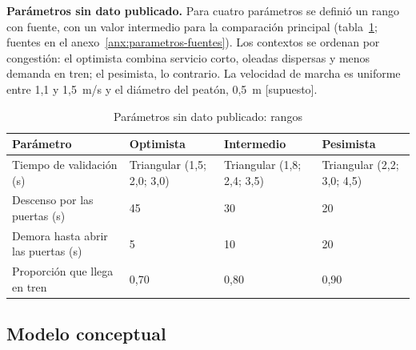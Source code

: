 \textbf{Parámetros sin dato publicado.} Para cuatro parámetros se definió un rango con fuente, con un valor
intermedio para la comparación principal (tabla~\ref{tab:parametros}; fuentes en el
anexo~\ref{anx:parametros-fuentes}). Los contextos se ordenan por congestión: el optimista combina servicio
corto, oleadas dispersas y menos demanda en tren; el pesimista, lo contrario. La velocidad de marcha es
uniforme entre 1,1 y 1,5~m/s \parencite{li2024} y el diámetro del peatón, 0,5~m [supuesto].

\begin{table}[H]
\centering
\caption{Parámetros sin dato publicado: rangos}
\label{tab:parametros}
\small
\begin{tabular}{@{}llll@{}}
\toprule
Parámetro & Optimista & Intermedio & Pesimista \\
\midrule
Tiempo de validación (s) & Triangular (1,5; 2,0; 3,0) & Triangular (1,8; 2,4; 3,5) & Triangular (2,2; 3,0; 4,5) \\
Descenso por las puertas (s) & 45 & 30 & 20 \\
Demora hasta abrir las puertas (s) & 5 & 10 & 20 \\
Proporción que llega en tren & 0,70 & 0,80 & 0,90 \\
\bottomrule
\end{tabular}
\end{table}

\subsection{Modelo conceptual}

